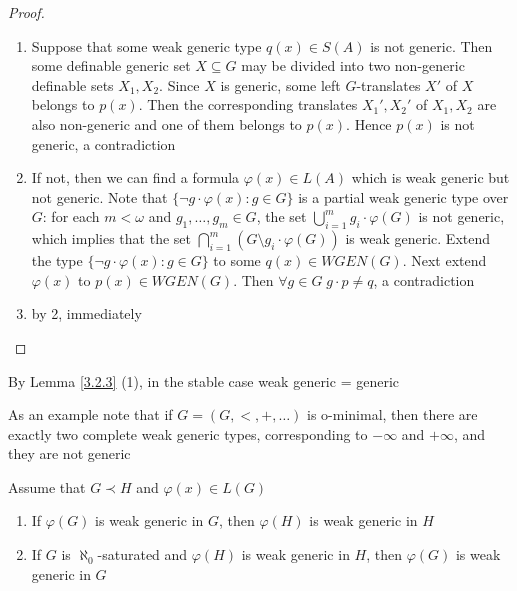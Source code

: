 \documentclass[11pt]{article}
\begin{document}
\begin{proof}
\begin{enumerate}
\item Suppose that some weak generic type \(q(x)\in S(A)\) is not generic. Then some definable
generic set \(X\subseteq G\) may be divided into two non-generic definable sets \(X_1,X_2\).
Since \(X\) is generic, some left \(G\)-translates \(X'\) of \(X\) belongs to \(p(x)\). Then
the corresponding translates \(X_1',X_2'\) of \(X_1,X_2\) are also non-generic and one of them
belongs to \(p(x)\). Hence \(p(x)\) is not generic, a contradiction
\item If not, then we can find a formula \(\varphi(x)\in L(A)\) which is weak generic but not generic. Note
that \(\{\neg g\cdot\varphi(x):g\in G\}\) is a partial weak generic type over \(G\): for each \(m<\omega\)
and \(g_1,\dots,g_m\in G\), the set \(\bigcup_{i=1}^mg_i\cdot\varphi(G)\) is not generic, which implies that the
set \(\bigcap_{i=1}^m(G\setminus g_i\cdot\varphi(G))\) is weak generic. Extend the type \(\{\neg g\cdot\varphi(x):g\in G\}\) to
some \(q(x)\in WGEN(G)\). Next extend \(\varphi(x)\) to \(p(x)\in WGEN(G)\). Then \(\forall g\in G\;g\cdot p\neq q\),
a contradiction
\item by 2, immediately
\end{enumerate}
\end{proof}

By Lemma \ref{3.2.3} (1), in the stable case weak generic = generic

As an example note that if \(G=(G,<,+,\dots)\) is o-minimal, then there are exactly two complete weak
generic types, corresponding to \(-\infty\) and \(+\infty\), and they are not generic

\begin{lemma}[]
\label{3.2.4}
Assume that \(G\prec H\) and \(\varphi(x)\in L(G)\)
\begin{enumerate}
\item If \(\varphi(G)\) is weak generic in \(G\), then \(\varphi(H)\) is weak generic in \(H\)
\item If \(G\) is \(\aleph_0\)-saturated and \(\varphi(H)\) is weak generic in \(H\), then \(\varphi(G)\) is weak
generic in \(G\)
\end{enumerate}
\end{lemma}
\end{document}
